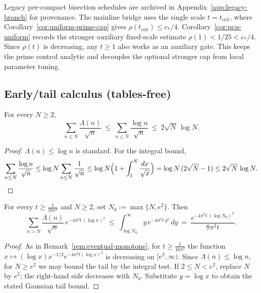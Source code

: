 \begin{remark}\label{rem:uniform-vs-local-full}
Legacy per-compact bisection schedules are archived in Appendix~\ref{app:legacy-branch} for provenance.
The mainline bridge uses the single scale \(t=t_{\mathrm{crit}}\), where
Corollary~\ref{cor:uniform-prime-cap} gives
\(\rho(t_{\mathrm{crit}})\le c_*/4\). Corollary~\ref{cor:pcu-uniform} records the stronger auxiliary fixed-scale estimate
\(\rho(1)<1/25<c_*/4\). Since \(\rho(t)\) is decreasing, any \(t\ge 1\) also works as an auxiliary gate. This keeps the prime control analytic and decouples the optional stronger cap from local parameter tuning.
\end{remark}

\subsection*{Early/tail calculus (tables-free)}

\begin{lemma}\label{lem:rkhs-early}
For every $N\ge2$,
\[
\sum_{n\le N}\frac{\Lambda(n)}{\sqrt{n}}
\ \le\ \sum_{n\le N}\frac{\log n}{\sqrt{n}}
\ \le\ 2\sqrt{N}\,\log N.
\]
\end{lemma}

\begin{proof}
$\Lambda(n)\le\log n$ is standard. For the integral bound,
\[
\sum_{n\le N}\frac{\log n}{\sqrt{n}}
\le \log N \sum_{n\le N}\frac{1}{\sqrt{n}}
\le \log N\Bigl(1+\int_{1}^{N}\frac{dx}{\sqrt{x}}\Bigr)
= \log N\,(2\sqrt{N}-1)
\le 2\sqrt{N}\,\log N.
\]
\end{proof}

\begin{lemma}\label{lem:rkhs-tail}
For every $t\ge \tfrac{1}{16\pi^2}$ and $N\ge2$, set $N_0:=\max\{N,e^2\}$. Then
\[
\sum_{n>N}\frac{\Lambda(n)}{\sqrt{n}}\,e^{-4\pi^2 t\,(\log n)^2}
\ \le\ \int_{\log N_0}^{\infty} y\,e^{-4\pi^2 t\,y^2}\,dy
\ =\ \frac{e^{-4\pi^2 t\,(\log N_0)^2}}{8\pi^2 t}.
\]
\end{lemma}

\begin{proof}
As in Remark~\ref{rem:eventual-monotone}, for $t\ge \tfrac{1}{16\pi^2}$ the function
$x\mapsto (\log x)x^{-1/2}e^{-4\pi^2 t(\log x)^2}$ is decreasing on $[e^2,\infty)$.
Since $\Lambda(n)\le\log n$, for $N\ge e^2$ we may bound the tail by the integral test.
If $2\le N<e^2$, replace $N$ by $e^2$; the right-hand side decreases with $N_0$.
Substitute $y=\log x$ to obtain the stated Gaussian tail bound.
\end{proof}

